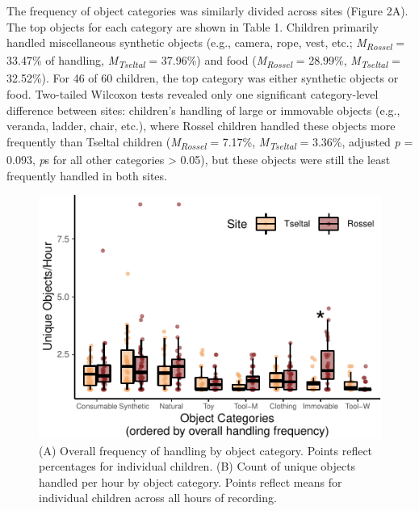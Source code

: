 \documentclass[10pt, letterpaper]{article}
\newenvironment{CodeChunk}{}{}
\begin{document}
The frequency of object categories was similarly divided across sites
(Figure 2A). The top objects for each category are shown in Table 1.
Children primarily handled miscellaneous synthetic objects (e.g.,
camera, rope, vest, etc.; \emph{M}\textsubscript{\emph{Rossel}} =
33.47\% of handling, \emph{M}\textsubscript{\emph{Tseltal}} = 37.96\%)
and food (\emph{M}\textsubscript{\emph{Rossel}} = 28.99\%,
\emph{M}\textsubscript{\emph{Tseltal}} = 32.52\%). For 46 of 60
children, the top category was either synthetic objects or food.
Two-tailed Wilcoxon tests revealed only one significant category-level
difference between sites: children's handling of large or immovable
objects (e.g., veranda, ladder, chair, etc.), where Rossel children
handled these objects more frequently than Tseltal children
(\emph{M}\textsubscript{\emph{Rossel}} = 7.17\%,
\emph{M}\textsubscript{\emph{Tseltal}} = 3.36\%, adjusted \emph{p} =
0.093, \emph{p}s for all other categories \textgreater{} 0.05), but
these objects were still the least frequently handled in both sites.

\begin{CodeChunk}
\begin{figure}[!h]

{\centering \includegraphics{figs/overall-stats-fig-1} 

}

\caption[(A) Overall frequency of handling by object category]{(A) Overall frequency of handling by object category. Points reflect percentages for individual children. (B) Count of unique objects handled per hour by object category. Points reflect means for individual children across all hours of recording.}\label{fig:overall-stats-fig}
\end{figure}
\end{CodeChunk}
\end{document}

